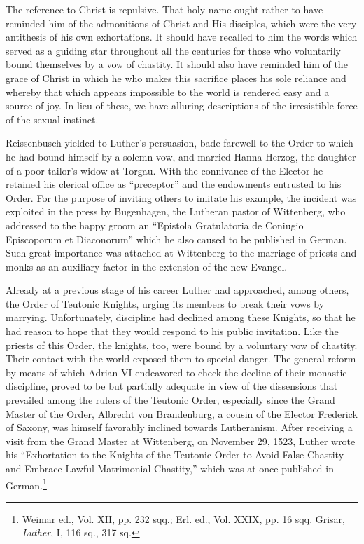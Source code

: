 The reference to Christ is repulsive. That holy name ought rather to have
reminded him of the admonitions of Christ and His disciples, which were
the very antithesis of his own exhortations. It should have recalled to him
the words which served as a guiding star throughout all the centuries
for those who voluntarily bound themselves by a vow of chastity.
It should also have reminded him of the grace of Christ in which he who
makes this sacrifice places his sole reliance and whereby that which appears
impossible to the world is rendered easy and a source of joy. In lieu of these,
we have alluring descriptions of the irresistible force of the sexual instinct.

Reissenbusch yielded to Luther’s persuasion, bade farewell to the
Order to which he had bound himself by a solemn vow, and married
Hanna Herzog, the daughter of a poor tailor’s widow at Torgau.
With the connivance of the Elector he retained his clerical office as
“preceptor” and the endowments entrusted to his Order. For the purpose
of inviting others to imitate his example, the incident was exploited
in the press by Bugenhagen, the Lutheran pastor of Wittenberg,
who addressed to the happy groom an “Epistola Gratulatoria
de Coniugio Episcoporum et Diaconorum” which he also caused to
be published in German. Such great importance was attached at Wittenberg
to the marriage of priests and monks as an auxiliary factor
in the extension of the new Evangel.

Already at a previous stage of his career Luther had approached,
among others, the Order of Teutonic Knights, urging its members
to break their vows by marrying. Unfortunately, discipline had declined
among these Knights, so that he had reason to hope that they
would respond to his public invitation. Like the priests of this Order,
the knights, too, were bound by a voluntary vow of chastity. Their
contact with the world exposed them to special danger. The general
reform by means of which Adrian VI endeavored to check the decline
of their monastic discipline, proved to be but partially adequate in
view of the dissensions that prevailed among the rulers of the Teutonic
Order, especially since the Grand Master of the Order, Albrecht
von Brandenburg, a cousin of the Elector Frederick of Saxony, was
himself favorably inclined towards Lutheranism. After receiving a
visit from the Grand Master at Wittenberg, on November 29, 1523,
Luther wrote his “Exhortation to the Knights of the Teutonic Order
to Avoid False Chastity and Embrace Lawful Matrimonial Chastity,”
which was at once published in German.\footnote
{Weimar ed., Vol. XII, pp. 232 sqq.; Erl. ed., Vol. XXIX, pp. 16 sqq. Grisar, \textit{Luther},
I, 116 sq., 317 sq.}

